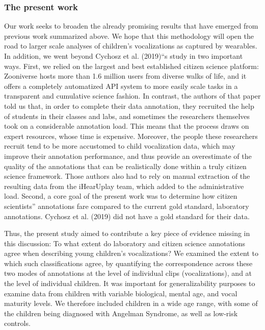 \documentclass[english,,man,floatsintext]{apa6}
\begin{document}
\hypertarget{the-present-work}{%
\subsubsection{The present work}\label{the-present-work}}

Our work seeks to broaden the already promising results that have emerged from previous work summarized above. We hope that this methodology will open the road to larger scale analyses of children's vocalizations as captured by wearables. In addition, we went beyond Cychosz et al. (2019)\enquote{s study in two important ways. First, we relied on the largest and best established citizen science platform: Zooniverse hosts more than 1.6 million users from diverse walks of life, and it offers a completely automatized API system to more easily scale tasks in a transparent and cumulative science fashion. In contrast, the authors of that paper told us that, in order to complete their data annotation, they recruited the help of students in their classes and labs, and sometimes the researchers themselves took on a considerable annotation load. This means that the process draws on expert resources, whose time is expensive. Moreover, the people these researchers recruit tend to be more accustomed to child vocalization data, which may improve their annotation performance, and thus provide an overestimate of the quality of the annotations that can be realistically done within a truly citizen science framework. Those authors also had to rely on manual extraction of the resulting data from the iHearUplay team, which added to the administrative load. Second, a core goal of the present work was to determine how citizen scientists} annotations fare compared to the current gold standard, laboratory annotations. Cychosz et al. (2019) did not have a gold standard for their data.

Thus, the present study aimed to contribute a key piece of evidence missing in this discussion: To what extent do laboratory and citizen science annotations agree when describing young children's vocalizations? We examined the extent to which such classifications agree, by quantifying the correspondence across these two modes of annotations at the level of individual clips (vocalizations), and at the level of individual children. It was important for generalizability purposes to examine data from children with variable biological, mental age, and vocal maturity levels. We therefore included children in a wide age range, with some of the children being diagnosed with Angelman Syndrome, as well as low-risk controls.
\end{document}
